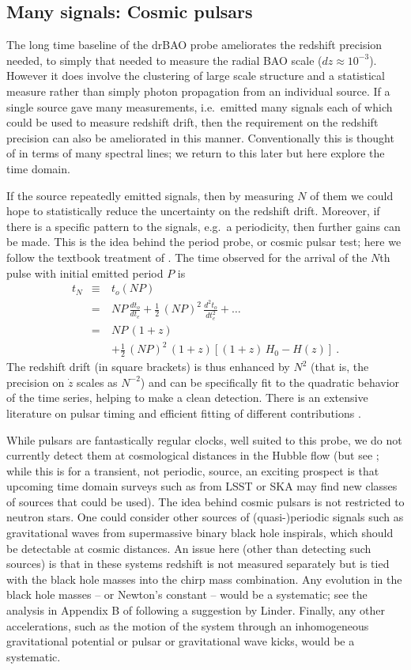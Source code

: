 \documentclass[preprint2, 10pt]{aastex}
\newcommand{\bea}{\begin{eqnarray}}
\newcommand{\eea}{\end{eqnarray}}
\begin{document}
{\subsection{Many signals: Cosmic pulsars} 

The long time baseline of the drBAO probe ameliorates the redshift 
precision needed, to simply that needed to measure the radial BAO scale 
($dz\approx10^{-3}$).  However it does involve the clustering of large scale 
structure and a statistical measure rather than simply photon propagation 
from an individual source.  If a single source gave many measurements, 
i.e.\ emitted many signals each of which could be used to measure redshift 
drift, then the requirement on the redshift precision can also be 
ameliorated in this manner.  
Conventionally this is thought of in terms of many spectral lines; we 
return to this later but here explore the time domain. 

If the source repeatedly emitted signals, then by measuring $N$ of them 
we could hope to statistically reduce the uncertainty on the redshift drift.  
Moreover, if there 
is a specific pattern to the signals, e.g.\ a periodicity, then further 
gains can be made.  This is the idea behind the period probe, or cosmic 
pulsar test; here we follow the textbook treatment of \citet{fpoc}.  The time 
observed for the arrival of the $N$th pulse with initial emitted period $P$ is 
\bea 
t_N&\equiv& t_o(NP)\nonumber\\ 
&=&NP\,\frac{dt_o}{dt_e}+\frac{1}{2}\,(NP)^2\,\frac{d^2t_o}{dt_e^2}+\dots\\ 
&=&NP\,(1+z)\nonumber\\ 
&\quad&+\frac{1}{2}\,(NP)^2\,(1+z)\left[(1+z)\,H_0-H(z)\right]\ . 
\eea 
The redshift drift (in square brackets) is thus enhanced by $N^2$ (that 
is, the precision on $\dot z$ scales as $N^{-2}$) and 
can be specifically fit to the quadratic behavior of the time series, 
helping to make a clean detection.  There is an extensive literature on 
pulsar timing and efficient fitting of different contributions 
\citep{pulsars}. 

While pulsars are fantastically regular clocks, well suited to this probe, 
we do not currently detect them at cosmological distances in the Hubble 
flow (but see \citet{13071628}; 
while this is for a transient, 
not periodic, source, an exciting prospect is that upcoming time domain surveys 
such as from LSST or SKA may find new classes of sources that could be used).
The idea behind cosmic pulsars is not 
restricted to neutron stars.  
One could consider other sources of (quasi-)periodic signals such as 
gravitational waves from supermassive binary black hole inspirals, which 
should be detectable 
at cosmic distances.  An issue here (other than detecting such sources) 
is that in these systems redshift is not measured separately but is tied 
with the black hole masses into the chirp mass combination.  Any evolution 
in the black hole masses -- or Newton's constant -- would be a systematic; 
see the analysis in Appendix B of \citet{09122724} following a suggestion 
by Linder.  Finally, any other accelerations, such as the motion of the system 
through an inhomogeneous gravitational potential or pulsar or gravitational 
wave kicks, would be a systematic. 


}
\end{document}
